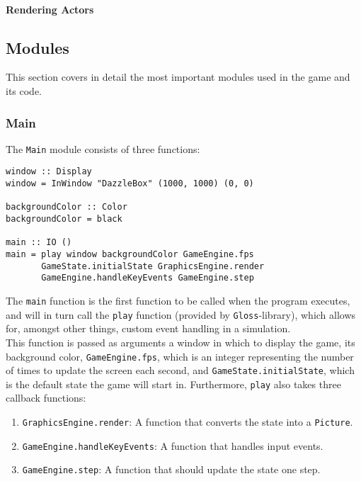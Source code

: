 \documentclass{article}
\begin{document}
\paragraph{Rendering Actors}

    	\subsection{Modules}
        This section covers in detail the most important modules used in the game and its code.
        \subsubsection{Main}
        The \texttt{Main} module consists of three functions:
        \begin{verbatim}
window :: Display
window = InWindow "DazzleBox" (1000, 1000) (0, 0)

backgroundColor :: Color
backgroundColor = black

main :: IO ()
main = play window backgroundColor GameEngine.fps
       GameState.initialState GraphicsEngine.render
       GameEngine.handleKeyEvents GameEngine.step
        \end{verbatim}

		\noindent The \texttt{main} function is the first function to be called when the program executes, and will in turn call the \texttt{play} function (provided by \texttt{Gloss}-library), which allows for, amongst other things, custom event handling in a simulation. \\
        \newline
        This function is passed as arguments a window in which to display the game, its background color,  \texttt{GameEngine.fps}, which is an integer representing the number of times to update the screen each second, and \texttt{GameState.initialState}, which is the default state the game will start in. Furthermore, \texttt{play} also takes three callback functions:
        \begin{enumerate}
        \item \texttt{GraphicsEngine.render}: A function that converts the state into a \texttt{Picture}.
        \item \texttt{GameEngine.handleKeyEvents}: A function that handles input events.
        \item \texttt{GameEngine.step}: A function that should update the state one step.
        \end{enumerate}
\end{document}
